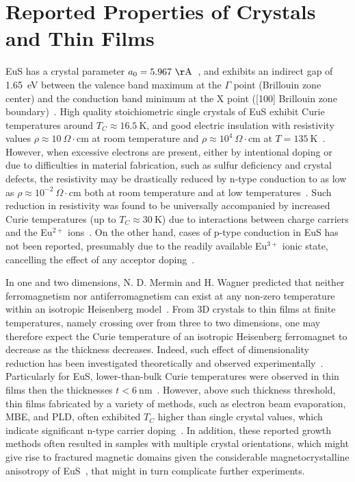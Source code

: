 \section{Reported Properties of Crystals and Thin Films}
EuS has a crystal parameter $a_0=5.967~\mathrm\AA$~\cite{EuS_Shafer}, and exhibits an indirect gap of 1.65~eV between the valence band maximum at the $\Gamma$ point (Brillouin zone center) and the conduction band minimum at the X point ([100] Brillouin zone boundary)~\cite{EuX_absorption, EuS_band_th1, EuS_band_th2}. High quality stoichiometric single crystals of EuS exhibit Curie temperatures around $T_C\approx16.5~\mathrm{K}$, and good electric insulation with resistivity values $\rho\approx10~\Omega\cdot\mathrm{cm}$ at room temperature and $\rho\approx10^4~\Omega\cdot\mathrm{cm}$ at $T=135~\mathrm{K}$~\cite{EuS_Shafer}. However, when excessive electrons are present, either by intentional doping or due to difficulties in material fabrication, such as sulfur deficiency and crystal defects, the resistivity may be drastically reduced by n-type conduction to as low as $\rho\approx10^{-2}~\Omega\cdot\mathrm{cm}$ both at room temperature and at low temperatures~\cite{EuS_LaDoped, EuS_ntype}. Such reduction in resistivity was found to be universally accompanied by increased Curie temperatures (up to $T_C\approx30~\mathrm{K}$) due to interactions between charge carriers and the Eu$^{2+}$ ions~\cite{EuS_TC_doping, EuS_ntype, EuX_doped_transport, EuX_RKKY}. On the other hand, cases of p-type conduction in EuS has not been reported, presumably due to the readily available Eu$^{3+}$ ionic state, cancelling the effect of any acceptor doping~\cite{EuX_doped_transport}.

In one and two dimensions, N. D. Mermin and H. Wagner predicted that neither ferromagnetism nor antiferromagnetism can exist at any non-zero temperature within an isotropic Heisenberg model~\cite{Mermin1966}. From 3D crystals to thin films at finite temperatures, namely crossing over from three to two dimensions, one may therefore expect the Curie temperature of an isotropic Heisenberg ferromagnet to decrease as the thickness decreases. Indeed, such effect of dimensionality reduction has been investigated theoretically and observed experimentally~\cite{thickness_Tc_theory, thickness_Tc_exp}. Particularly for EuS, lower-than-bulk Curie temperatures were observed in thin films then the thicknesses $t < 6~\mathrm{nm}$~\cite{EuS_MBE_Muller}. However, above such thickness threshold, thin films fabricated by a variety of methods, such as electron beam evaporation, MBE, and PLD, often exhibited $T_C$ higher than single crystal values, which indicate significant n-type carrier doping~\cite{EuS_MBE_Muller, EuS_thin_film_Keller, EuS_PLD1, EuS_PLD2}. In addition, these reported growth methods often resulted in samples with multiple crystal orientations, which might give rise to fractured magnetic domains given the considerable magnetocrystalline anisotropy of EuS~\cite{EuS_anisotropy}, that might in turn complicate further experiments.

